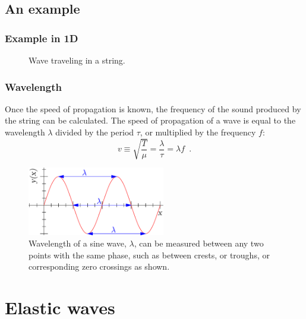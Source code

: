 \documentclass{beamer}
\begin{document}
\subsection{An example}
\begin{frame}\frametitle{Example in 1D}
\begin{figure}[H]
\centering
{}
\caption{Wave traveling in a string.}
\label{vid:string}
\end{figure}
\end{frame}


\begin{frame}\frametitle{Wavelength}
Once the speed of propagation is known, the frequency of the sound produced by the string can be calculated. The speed of propagation of a wave is equal to the wavelength $\lambda$ divided by the period $\tau$, or multiplied by the frequency $f$:
\[v \equiv \sqrt{\frac{T}{\mu}} =\frac{\lambda}{\tau} = \lambda f \enspace .  \]	
\begin{figure}[h]
	\centering
	\includegraphics[height=3cm]{img/Sine_wavelength.pdf}
	\caption{Wavelength of a sine wave, $\lambda$, can be measured between any two points with the same phase, such as between crests, or troughs, or corresponding zero crossings as shown.}
\end{figure}
\end{frame}

\section{Elastic waves}
\end{document}
